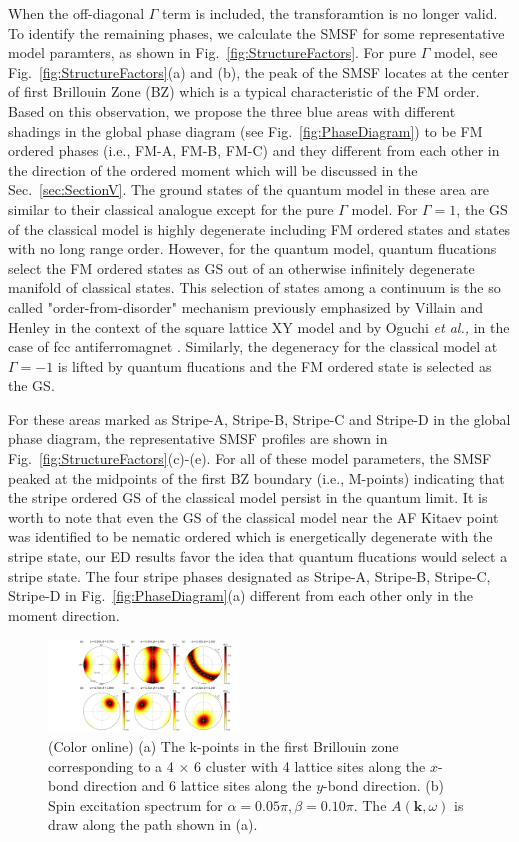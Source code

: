 \documentclass[aps,prb,reprint,amsfonts,amsmath,amssymb,showpacs,groupedaddress,superscriptaddress]{revtex4-1}
\begin{document}
When the off-diagonal $\Gamma$ term is included, the transforamtion is no longer valid. To identify the remaining phases, we calculate the SMSF for some representative model paramters, as shown in Fig.~\ref{fig:StructureFactors}. For pure $\Gamma$ model, see Fig.~\ref{fig:StructureFactors}(a) and (b), the peak of the SMSF locates at the center of first Brillouin Zone (BZ) which is a typical characteristic of the FM order. Based on this observation, we propose the three blue areas with different shadings in the global phase diagram (see Fig.~\ref{fig:PhaseDiagram}) to be FM ordered phases (i.e., FM-A, FM-B, FM-C) and they different from each other in the direction of the ordered moment which will be discussed in the Sec.~\ref{sec:SectionV}. The ground states of the quantum model in these area are similar to their classical analogue except for the pure $\Gamma$ model. For $\Gamma=1$, the GS of the classical model is highly degenerate including FM ordered states and states with no long range order. However, for the quantum model, quantum flucations select the FM ordered states as GS out of an otherwise infinitely degenerate manifold of classical states. This selection of states among a continuum is the so called "order-from-disorder" mechanism previously emphasized by Villain and Henley in the context of the square lattice XY model \cite{PhysRevLett.62.2056} and by Oguchi \emph{et al.,} in the case of fcc antiferromagnet \cite{JPSJ.54.4494}. Similarly, the degeneracy for the classical model at $\Gamma=-1$ is lifted by quantum flucations and the FM ordered state is selected as the GS.

For these areas marked as Stripe-A, Stripe-B, Stripe-C and Stripe-D in the global phase diagram, the representative SMSF profiles are shown in Fig.~\ref{fig:StructureFactors}(c)-(e). For all of these model parameters, the SMSF peaked at the midpoints of the first BZ boundary (i.e., M-points) indicating that the stripe ordered GS of the classical model persist in the quantum limit. It is worth to note that even the GS of the classical model near the AF Kitaev point was identified to be nematic ordered which is energetically degenerate with the stripe state, our ED results favor the idea that quantum flucations would select a stripe state. The four stripe phases designated as Stripe-A, Stripe-B, Stripe-C, Stripe-D in Fig.~\ref{fig:PhaseDiagram}(a) different from each other only in the moment direction.

\begin{figure}
    \includegraphics[width=0.45\textwidth]{Fig4.pdf}
    \caption{\label{fig:Spectrum}(Color online) (a) The k-points in the first Brillouin zone corresponding to a 4 $\times$ 6 cluster with 4 lattice sites along the $x$-bond direction and 6 lattice sites along the $y$-bond direction. (b) Spin excitation spectrum for $\alpha=0.05\pi,\beta=0.10\pi$. The $A(\bm{k}, \omega)$ is draw along the path shown in (a).}
\end{figure}
\end{document}
